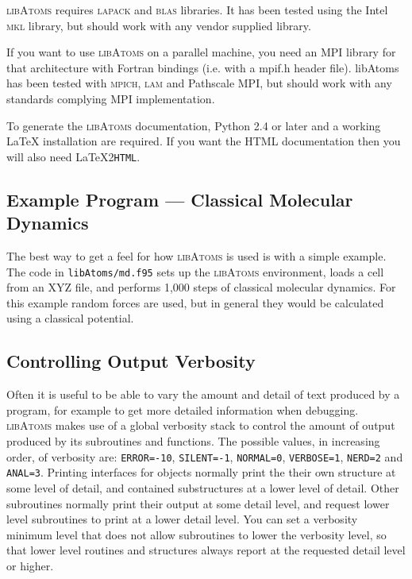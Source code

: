 \textsc{libAtoms} requires \textsc{lapack} and \textsc{blas}
libraries. It has been tested using the Intel \textsc{mkl} library,
but should work with any vendor supplied library.

If you want to use \textsc{libAtoms} on a parallel machine, you need
an MPI library for that architecture with Fortran bindings (i.e. with
a mpif.h header file). libAtoms has been tested with \textsc{mpich},
\textsc{lam} and Pathscale MPI, but should work with any standards complying
MPI implementation.

To generate the \textsc{libAtoms} documentation, Python 2.4 or later
 and a working \LaTeX{} installation are required. If you want the HTML
documentation then you will also need \LaTeX 2\texttt{HTML}.

\newpage

\subsection*{Example Program --- Classical Molecular Dynamics}

The best way to get a feel for how \textsc{libAtoms} is used
is with a simple example. The code in \texttt{libAtoms/md.f95} sets up
the \textsc{libAtoms} environment, loads a cell from
an XYZ file, and performs 1,000 steps of classical molecular
dynamics. For this example random forces are used, but in general
they would be calculated using a classical potential.

\subsection*{Controlling Output Verbosity}

Often it is useful to be able to vary the amount and detail of text
produced by a program, for example to get more detailed information
when debugging. \textsc{libAtoms} makes use of a global verbosity
stack to control the amount of output produced by its subroutines and
functions. The possible values, in increasing order, of verbosity are:
\texttt{ERROR=-10}, \texttt{SILENT=-1}, \texttt{NORMAL=0},
\texttt{VERBOSE=1}, \texttt{NERD=2} and \texttt{ANAL=3}.  Printing
interfaces for objects normally print the their own structure at some 
level of detail, and contained substructures at a lower level of detail.  
Other subroutines normally print their output at some detail level, and
request lower level subroutines to print at a lower detail level.
You can set a verbosity minimum level that does not allow subroutines
to lower the verbosity level, so that lower level routines and structures
always report at the requested detail level or higher.

